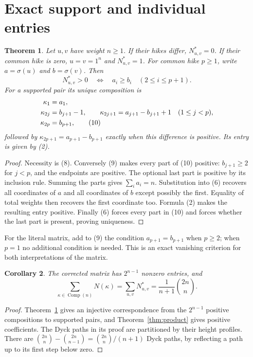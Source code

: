 \documentclass[11pt]{article}
\newtheorem{theorem}{Theorem}
\newtheorem{corollary}[theorem]{Corollary}
\newcommand{\Comp}{\operatorname{Comp}}
\begin{document}
\section{Exact support and individual entries}
\begin{theorem}\label{thm:support}
Let $u,v$ have weight $n\ge1$. If their hikes differ, $N^*_{u,v}=0$.
If their common hike is zero, $u=v=1^n$ and $N^*_{u,v}=1$.
For common hike $p\ge1$, write $a=\sigma(u)$ and $b=\sigma(v)$.
Then
\[
 N^*_{u,v}>0\quad\Longleftrightarrow\quad
 a_i\ge b_i\quad(2\le i\le p+1).
 \tag{9}
\]
For a supported pair its unique composition is
\begin{align}
 \kappa_1&=a_1,\notag\\
 \kappa_{2j}&=b_{j+1}-1,\qquad
 \kappa_{2j+1}=a_{j+1}-b_{j+1}+1\quad(1\le j<p),\notag\\
 \kappa_{2p}&=b_{p+1},
 \tag{10}
\end{align}
followed by $\kappa_{2p+1}=a_{p+1}-b_{p+1}$ exactly when this
difference is positive. Its entry is given by (2).
\end{theorem}
\begin{proof}
Necessity is (8). Conversely (9) makes every part of (10) positive:
$b_{j+1}\ge2$ for $j<p$, and the endpoints are positive. The optional
last part is positive by its inclusion rule. Summing the parts gives
$\sum_i a_i=n$. Substitution into (6) recovers all coordinates of
$a$ and all coordinates of $b$ except possibly the first. Equality of
total weights then recovers the first coordinate too. Formula (2)
makes the resulting entry positive. Finally (6) forces every part in
(10) and forces whether the last part is present, proving uniqueness.
\end{proof}

For the literal matrix, add to (9) the condition
$a_{p+1}=b_{p+1}$ when $p\ge2$; when $p=1$ no additional condition
is needed. This is an exact vanishing criterion for both interpretations
of the matrix.

\begin{corollary}
The corrected matrix has $2^{n-1}$ nonzero entries, and
\[
 \sum_{\kappa\in\Comp(n)}N(\kappa)
 =\sum_{u,v}N^*_{u,v}=\frac1{n+1}\binom{2n}{n}.
 \tag{11}
\]
\end{corollary}
\begin{proof}
Theorem~\ref{thm:support} gives an injective correspondence from the
$2^{n-1}$ positive compositions to supported pairs, and
Theorem~\ref{thm:product} gives positive coefficients.
The Dyck paths in its proof are partitioned by their height profiles.
There are $\binom{2n}{n}-\binom{2n}{n-1}=\binom{2n}{n}/(n+1)$
Dyck paths, by reflecting a path up to its first step below zero.
\end{proof}
\end{document}
